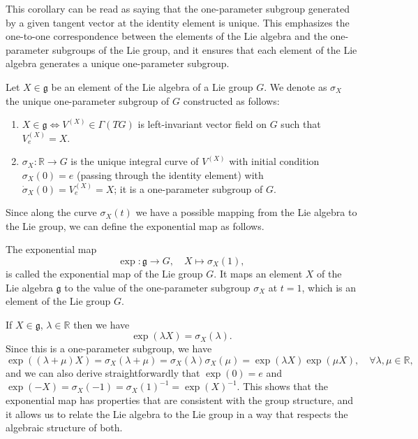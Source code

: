 This corollary can be read as saying that the one-parameter subgroup generated by a given tangent vector at the identity element is unique. This emphasizes the one-to-one correspondence between the elements of the Lie algebra and the one-parameter subgroups of the Lie group, and it ensures that each element of the Lie algebra generates a unique one-parameter subgroup.

\begin{definition}
    Let \(X \in \mathfrak{g}\) be an element of the Lie algebra of a Lie group \(G\). We denote as \(\sigma_X\) the unique one-parameter subgroup of \(G\) constructed as follows:
    \begin{enumerate}
        \item \(X \in \mathfrak{g} \iff V^{(X)} \in \Gamma(TG)\) is left-invariant vector field on \(G\) such that \(V^{(X)}_e = X\).
        \item \(\sigma_X : \mathbb{R} \to G\) is the unique integral curve of \(V^{(X)}\) with initial condition \(\sigma_X(0) = e\) (passing through the identity element) with \(\dot{\sigma}_X(0) = V_e^{(X)} = X\); it is a one-parameter subgroup of \(G\).
    \end{enumerate}
\end{definition}

Since along the curve \(\sigma_X(t)\) we have a possible mapping from the Lie algebra to the Lie group, we can define the exponential map as follows.

\begin{definition}
    The exponential map
    \[
        \exp : \mathfrak{g} \to G, \quad X \mapsto \sigma_X(1),
    \]
    is called the exponential map of the Lie group \(G\). It maps an element \(X\) of the Lie algebra \(\mathfrak{g}\) to the value of the one-parameter subgroup \(\sigma_X\) at \(t = 1\), which is an element of the Lie group \(G\).
\end{definition}

\begin{proposition}
    If \(X \in \mathfrak{g}\), \(\lambda \in \mathbb{R}\) then we have
    \[
        \exp(\lambda X) = \sigma_X(\lambda).
    \]
    Since this is a one-parameter subgroup, we have
    \[
        \exp((\lambda + \mu) X) = \sigma_X(\lambda + \mu) = \sigma_X(\lambda) \sigma_X(\mu) = \exp(\lambda X) \exp(\mu X), \quad \forall \lambda, \mu \in \mathbb{R},
    \]
    and we can also derive straightforwardly that \(\exp(0) = e\) and \(\exp(-X) = \sigma_X(-1) = \sigma_X(1)^{-1} = \exp(X)^{-1}\). This shows that the exponential map has properties that are consistent with the group structure, and it allows us to relate the Lie algebra to the Lie group in a way that respects the algebraic structure of both.
\end{proposition}


